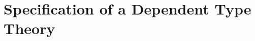 \documentclass[acmsmall,screen=true,
\ifpublic review=false\else,review=true\fi
  ,anonymous=\ifanonymous true\else false\fi]{acmart}
\newcommand{\scw}[1]{}
\begin{document}




\scw{The end of this section needs to include an explicit summar of the
contributions of the paper. }

\section{Specification of a Dependent Type Theory}
\label{sec:spec}
\end{document}
